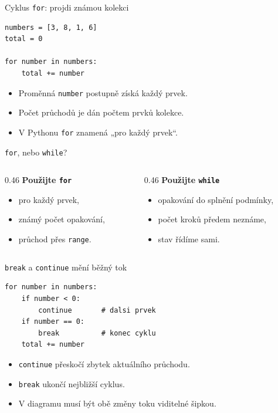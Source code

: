 \documentclass[aspectratio=169]{beamer}
\begin{document}
\begin{frame}[fragile]{Cyklus \texttt{for}: projdi známou kolekci}
\begin{lstlisting}[style=python]
numbers = [3, 8, 1, 6]
total = 0

for number in numbers:
    total += number
\end{lstlisting}
  \begin{itemize}
    \item Proměnná \texttt{number} postupně získá každý prvek.
    \item Počet průchodů je dán počtem prvků kolekce.
    \item V Pythonu \texttt{for} znamená „pro každý prvek“.
  \end{itemize}
\end{frame}

\begin{frame}{\texttt{for}, nebo \texttt{while}?}
  \begin{columns}[T]
    \begin{column}{0.46\textwidth}
      \textbf{Použijte \texttt{for}}
      \begin{itemize}
        \item pro každý prvek,
        \item známý počet opakování,
        \item průchod přes \texttt{range}.
      \end{itemize}
    \end{column}
    \begin{column}{0.46\textwidth}
      \textbf{Použijte \texttt{while}}
      \begin{itemize}
        \item opakování do splnění podmínky,
        \item počet kroků předem neznáme,
        \item stav řídíme sami.
      \end{itemize}
    \end{column}
  \end{columns}
\end{frame}

\begin{frame}[fragile]{\texttt{break} a \texttt{continue} mění běžný tok}
\begin{lstlisting}[style=python]
for number in numbers:
    if number < 0:
        continue       # dalsi prvek
    if number == 0:
        break          # konec cyklu
    total += number
\end{lstlisting}
  \begin{itemize}
    \item \texttt{continue} přeskočí zbytek aktuálního průchodu.
    \item \texttt{break} ukončí nejbližší cyklus.
    \item V diagramu musí být obě změny toku viditelné šipkou.
  \end{itemize}
\end{frame}
\end{document}
